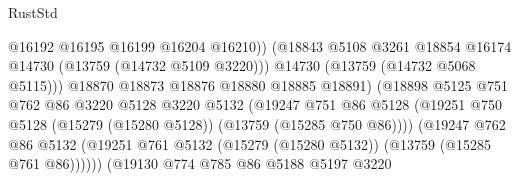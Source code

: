 \begin{lexlean}{RustStd}
\begin{coremodule}
                                            @16192
                                            @16195
                                            @16199
                                            @16204
                                            @16210))
                                        (@18843
                                          @5108
                                          @3261
                                          @18854
                                          @16174
                                          @14730
                                          (@13759 (@14732 @5109 @3220)))
                                        @14730
                                        (@13759 (@14732 @5068 @5115)))
                                      @18870
                                      @18873
                                      @18876
                                      @18880
                                      @18885
                                      @18891)
                                    (@18898
                                      @5125
                                      @751
                                      @762
                                      @86
                                      @3220
                                      @5128
                                      @3220
                                      @5132
                                      (@19247
                                        @751
                                        @86
                                        @5128
                                        (@19251
                                          @750
                                          @5128
                                          (@15279 (@15280 @5128))
                                          (@13759 (@15285 @750 @86))))
                                      (@19247
                                        @762
                                        @86
                                        @5132
                                        (@19251
                                          @761
                                          @5132
                                          (@15279 (@15280 @5132))
                                          (@13759 (@15285 @761 @86))))))
                                  (@19130
                                    @774
                                    @785
                                    @86
                                    @5188
                                    @5197
                                    @3220

\end{coremodule}
\end{lexlean}
